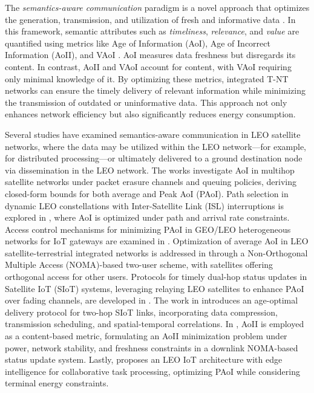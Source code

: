 \documentclass[lettersize,journal]{IEEEtran}
\begin{document}
    The \emph{semantics-aware communication} paradigm is a novel approach that optimizes the generation, transmission, and utilization of fresh and informative data \cite{kountouris2021semantics}. In this framework, semantic attributes such as \emph{timeliness}, \emph{relevance}, and \emph{value} are quantified using metrics like Age of Information (AoI)\cite{kaul2012real}, Age of Incorrect Information (AoII)\cite{maatouk2020age}, and VAoI \cite{yates2021Vage}. AoI measures data freshness but disregards its content. In contrast, AoII and VAoI account for content, with VAoI requiring only minimal knowledge of it. By optimizing these metrics, integrated T-NT networks can ensure the timely delivery of relevant information while minimizing the transmission of outdated or uninformative data. This approach not only enhances network efficiency but also significantly reduces energy consumption.

    Several studies have examined semantics-aware communication in LEO satellite networks, where the data may be utilized within the LEO network---for example, for distributed processing---or ultimately delivered to a ground destination node via dissemination in the LEO network.
    The works \cite{soret2020latency, chiariotti2022age} investigate AoI in multihop satellite networks under packet erasure channels and queuing policies, deriving closed-form bounds for both average and Peak AoI (PAoI). Path selection in dynamic LEO constellations with Inter-Satellite Link (ISL) interruptions is explored in \cite{li2022age}, where AoI is optimized under path and arrival rate constraints. Access control mechanisms for minimizing PAoI in GEO/LEO heterogeneous networks for IoT gateways are examined in \cite{cai2022age}. 
    Optimization of average AoI in LEO satellite-terrestrial integrated networks is addressed in \cite{gao2022non} through a Non-Orthogonal Multiple Access (NOMA)-based two-user scheme, with satellites offering orthogonal access for other users. Protocols for timely dual-hop status updates in Satellite IoT (SIoT) systems, leveraging relaying LEO satellites to enhance PAoI over fading channels, are developed in \cite{huang2023age, jiao2022age}. The work in \cite{xu2022age} introduces an age-optimal delivery protocol for two-hop SIoT links, incorporating data compression, transmission scheduling, and spatial-temporal correlations. In \cite{hong2023age}, AoII is employed as a content-based metric, formulating an AoII minimization problem under power, network stability, and freshness constraints in a downlink NOMA-based status update system. Lastly, \cite{liao2024information} proposes an LEO IoT architecture with edge intelligence for collaborative task processing, optimizing PAoI while considering terminal energy constraints.
\end{document}
